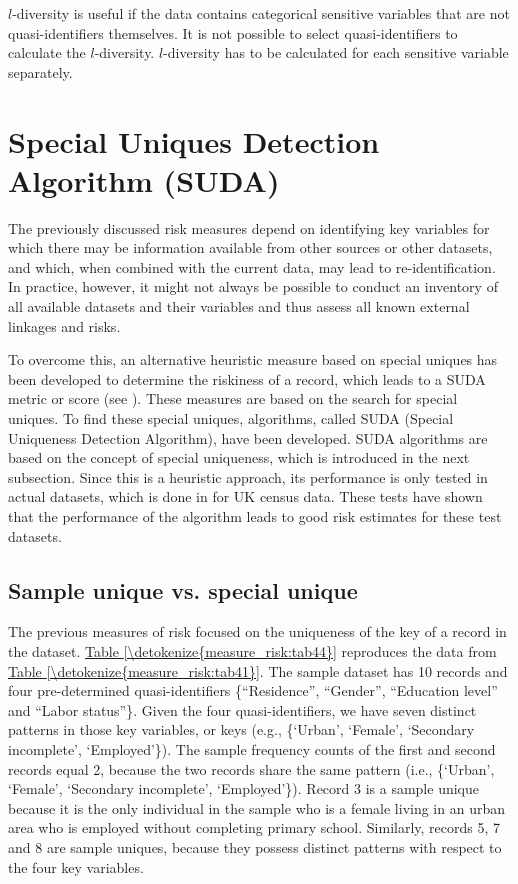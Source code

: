 \documentclass[letterpaper,10pt,english]{sphinxmanual}
\begin{document}
\(l\)-diversity is useful if the data contains categorical sensitive
variables that are not quasi-identifiers themselves. It is not possible
to select quasi-identifiers to calculate the \(l\)-diversity.
\(l\)-diversity has to be calculated for each sensitive variable
separately.


\section{Special Uniques Detection Algorithm (SUDA)}
\label{\detokenize{measure_risk:special-uniques-detection-algorithm-suda}}
The previously discussed risk measures depend on identifying key
variables for which there may be information available from other
sources or other datasets, and which, when combined with the current
data, may lead to re-identification. In practice, however, it might not
always be possible to conduct an inventory of all available datasets and
their variables and thus assess all known external linkages and risks.

To overcome this, an alternative heuristic measure based on special
uniques has been developed to determine the riskiness of a record, which
leads to a SUDA metric or score (see {\hyperref[\detokenize{measure_risk:elmf02}]{}}). These
measures are based on the search for special uniques. To find these
special uniques, algorithms, called SUDA (Special Uniqueness Detection
Algorithm), have been developed. SUDA algorithms are based on the
concept of special uniqueness, which is introduced in the next
subsection. Since this is a heuristic approach, its performance is only
tested in actual datasets, which is done in {\hyperref[\detokenize{measure_risk:elmf02}]{}} for UK
census data. These tests have shown that the performance of the
algorithm leads to good risk estimates for these test datasets.


\subsection{Sample unique vs. special unique}
\label{\detokenize{measure_risk:sample-unique-vs-special-unique}}
The previous measures of risk focused on the uniqueness of the key of a
record in the dataset. \hyperref[\detokenize{measure_risk:tab44}]{Table \ref{\detokenize{measure_risk:tab44}}} reproduces the data from \hyperref[\detokenize{measure_risk:tab41}]{Table \ref{\detokenize{measure_risk:tab41}}}. The
sample dataset has 10 records and four pre-determined quasi-identifiers
\{“Residence”, “Gender”, “Education level” and “Labor status”\}. Given the
four quasi-identifiers, we have seven distinct patterns in those key
variables, or keys (e.g., \{‘Urban’, ‘Female’, ‘Secondary incomplete’,
‘Employed’\}). The sample frequency counts of the first and second
records equal 2, because the two records share the same pattern (i.e.,
\{‘Urban’, ‘Female’, ‘Secondary incomplete’, ‘Employed’\}). Record 3 is a
sample unique because it is the only individual in the sample who is a
female living in an urban area who is employed without completing
primary school. Similarly, records 5, 7 and 8 are sample uniques,
because they possess distinct patterns with respect to the four key
variables.
\end{document}
